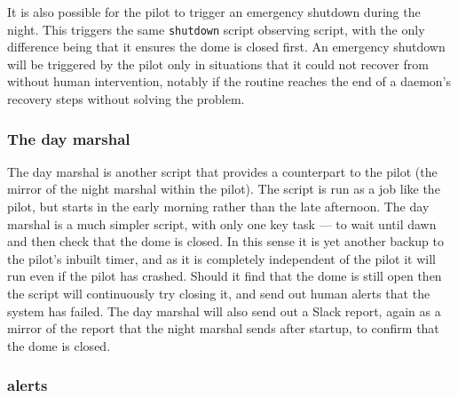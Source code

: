 \begin{colsection}
\begin{colsection}
It is also possible for the pilot to trigger an emergency shutdown during the night. This triggers the same \texttt{shutdown} script observing script, with the only difference being that it ensures the dome is closed first. An emergency shutdown will be triggered by the pilot only in situations that it could not recover from without human intervention, notably if the  routine reaches the end of a daemon's recovery steps without solving the problem.

\subsubsection{The day marshal}

The day marshal is another script that provides a counterpart to the pilot (the mirror of the night marshal within the pilot). The  script is run as a  job like the pilot, but starts in the early morning rather than the late afternoon. The day marshal is a much simpler script, with only one key task --- to wait until dawn and then check that the dome is closed. In this sense it is yet another backup to the pilot's inbuilt  timer, and as it is completely independent of the pilot it will run even if the pilot has crashed. Should it find that the dome is still open then the script will continuously try closing it, and send out human alerts that the system has failed. The day marshal will also send out a Slack report, again as a mirror of the report that the night marshal sends after startup, to confirm that the dome is closed.

\subsubsection{ alerts}


\end{colsection}
\end{colsection}
